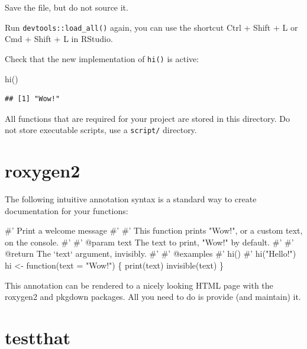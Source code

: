 \documentclass[]{book}
\newenvironment{Shaded}{}{}
\newcommand{\CommentTok}[1]{\textcolor[rgb]{0.00,0.50,0.00}{#1}}
\newcommand{\ControlFlowTok}[1]{\textcolor[rgb]{0.00,0.00,1.00}{#1}}
\newcommand{\DataTypeTok}[1]{#1}
\newcommand{\KeywordTok}[1]{\textcolor[rgb]{0.00,0.00,1.00}{#1}}
\newcommand{\NormalTok}[1]{#1}
\newcommand{\StringTok}[1]{\textcolor[rgb]{0.00,0.50,0.50}{#1}}
\begin{document}
Save the file, but do not source it.

Run \texttt{devtools::load\_all()} again, you can use the shortcut Ctrl + Shift + L or Cmd + Shift + L in RStudio.

Check that the new implementation of \texttt{hi()} is active:

\begin{Shaded}
\begin{Highlighting}[]
\KeywordTok{hi}\NormalTok{()}
\end{Highlighting}
\end{Shaded}

\begin{verbatim}
## [1] "Wow!"
\end{verbatim}

All functions that are required for your project are stored in this directory.
Do not store executable scripts, use a \texttt{script/} directory.

\hypertarget{roxygen2}{%
\section{roxygen2}\label{roxygen2}}

The following intuitive annotation syntax is a standard way to create documentation for your functions:

\begin{Shaded}
\begin{Highlighting}[]
\CommentTok{#' Print a welcome message}
\CommentTok{#' }
\CommentTok{#' This function prints "Wow!", or a custom text, on the console.}
\CommentTok{#'}
\CommentTok{#' @param text The text to print, "Wow!" by default.}
\CommentTok{#' }
\CommentTok{#' @return The `text` argument, invisibly.}
\CommentTok{#' }
\CommentTok{#' @examples}
\CommentTok{#' hi()}
\CommentTok{#' hi("Hello!")}
\NormalTok{hi <-}\StringTok{ }\ControlFlowTok{function}\NormalTok{(}\DataTypeTok{text =} \StringTok{"Wow!"}\NormalTok{) \{}
  \KeywordTok{print}\NormalTok{(text)}
  \KeywordTok{invisible}\NormalTok{(text)}
\NormalTok{\}}
\end{Highlighting}
\end{Shaded}

This annotation can be rendered to a nicely looking HTML page with the roxygen2 and pkgdown packages.
All you need to do is provide (and maintain) it.

\hypertarget{testthat}{%
\section{testthat}\label{testthat}}
\end{document}
